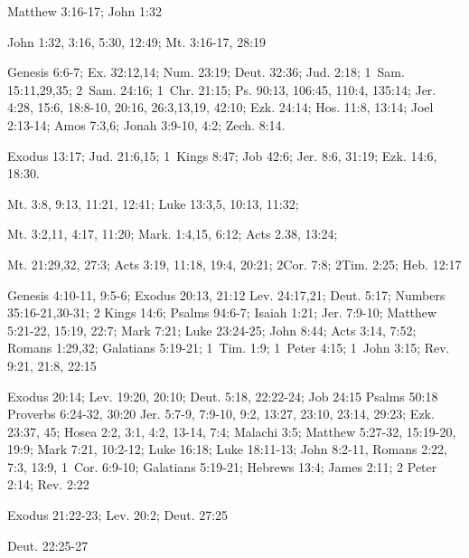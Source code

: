 {\begin{multicols*}{3}
{ 
    Matthew 3:16-17; John 1:32
    
    John 1:32, 3:16, 5:30, 12:49; Mt. 3:16-17, 28:19
    

{}
    Genesis 6:6-7;
    Ex. 32:12,14;
    Num. 23:19;
    Deut. 32:36;
    Jud. 2:18;
    1~Sam. 15:11,29,35;
    2~Sam. 24:16;
    1~Chr. 21:15;
    Ps. 90:13, 106:45, 110:4, 135:14;
    Jer. 4:28, 15:6, 18:8-10, 20:16, 26:3,13,19, 42:10;
    Ezk. 24:14;
    Hos. 11:8, 13:14;
    Joel 2:13-14; 
    Amos 7:3,6;
    Jonah 3:9-10, 4:2;
    Zech. 8:14.

    Exodus 13:17;
    Jud. 21:6,15;
    1~Kings 8:47;
    Job 42:6;
    Jer. 8:6, 31:19;
    Ezk. 14:6, 18:30.
    

    Mt. 3:8, 9:13, 11:21, 12:41;
    Luke 13:3,5, 10:13, 11:32;

    Mt. 3:2,11, 4:17, 11:20;
    Mark. 1:4,15, 6:12;
    Acts 2.38, 13:24;
    
    Mt. 21:29,32, 27:3;
    Acts 3:19, 11:18, 19:4, 20:21;
    2Cor. 7:8;
    2Tim. 2:25;
    Heb. 12:17
    

{}
    Genesis 4:10-11, 9:5-6; 
    Exodus 20:13, 21:12
    Lev. 24:17,21;
    Deut. 5:17;
    Numbers 35:16-21,30-31; 
    2 Kings 14:6;
    Psalms 94:6-7; 
    Isaiah 1:21;
    Jer. 7:9-10;
    Matthew 5:21-22, 15:19, 22:7;
    Mark 7:21;
    Luke 23:24-25;
    John 8:44;
    Acts 3:14, 7:52;
    Romans 1:29,32;
    Galatians 5:19-21;
    1~Tim. 1:9;
    1~Peter 4:15;
    1~John 3:15;
    Rev. 9:21, 21:8, 22:15
    
    Exodus 20:14;
    Lev. 19:20, 20:10;
    Deut. 5:18, 22:22-24;
    Job 24:15
    Psalms 50:18
    Proverbs 6:24-32, 30:20
    Jer. 5:7-9, 7:9-10, 9:2, 13:27, 23:10, 23:14, 29:23;
    Ezk. 23:37, 45;
    Hosea 2:2, 3:1, 4:2, 13-14, 7:4;
    Malachi 3:5;
    Matthew 5:27-32, 15:19-20, 19:9;
    Mark 7:21, 10:2-12;
    Luke 16:18; Luke 18:11-13; 
    John 8:2-11,
    Romans 2:22, 7:3, 13:9, 
    1~Cor. 6:9-10;
    Galatians 5:19-21;
    Hebrews 13:4;
    James 2:11;
    2 Peter 2:14;
    Rev. 2:22
    
    Exodus 21:22-23;
    Lev. 20:2;
    Deut. 27:25
    
    Deut. 22:25-27
    
}
\end{multicols*}}
